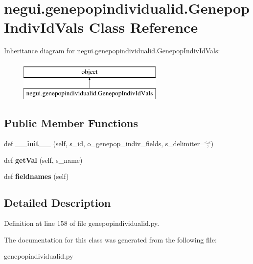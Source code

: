 \hypertarget{classnegui_1_1genepopindividualid_1_1GenepopIndivIdVals}{}\section{negui.\+genepopindividualid.\+Genepop\+Indiv\+Id\+Vals Class Reference}
\label{classnegui_1_1genepopindividualid_1_1GenepopIndivIdVals}
Inheritance diagram for negui.\+genepopindividualid.\+Genepop\+Indiv\+Id\+Vals\+:\begin{figure}[H]
\begin{center}
\leavevmode
\includegraphics[height=2.000000cm]{classnegui_1_1genepopindividualid_1_1GenepopIndivIdVals}
\end{center}
\end{figure}
\subsection*{Public Member Functions}
\begin{DoxyCompactItemize}
\item 
def {\bfseries \+\_\+\+\_\+init\+\_\+\+\_\+} (self, s\+\_\+id, o\+\_\+genepop\+\_\+indiv\+\_\+fields, s\+\_\+delimiter=\char`\"{};\char`\"{})\hypertarget{classnegui_1_1genepopindividualid_1_1GenepopIndivIdVals_a72145be2e4d8a444567c89818f3c0814}{}\label{classnegui_1_1genepopindividualid_1_1GenepopIndivIdVals_a72145be2e4d8a444567c89818f3c0814}

\item 
def {\bfseries get\+Val} (self, s\+\_\+name)\hypertarget{classnegui_1_1genepopindividualid_1_1GenepopIndivIdVals_a603565db54797a7551e4632b9d3442b3}{}\label{classnegui_1_1genepopindividualid_1_1GenepopIndivIdVals_a603565db54797a7551e4632b9d3442b3}

\item 
def {\bfseries fieldnames} (self)\hypertarget{classnegui_1_1genepopindividualid_1_1GenepopIndivIdVals_af40421346609ca97846993710f086802}{}\label{classnegui_1_1genepopindividualid_1_1GenepopIndivIdVals_af40421346609ca97846993710f086802}

\end{DoxyCompactItemize}


\subsection{Detailed Description}


Definition at line 158 of file genepopindividualid.\+py.



The documentation for this class was generated from the following file\+:\begin{DoxyCompactItemize}
\item 
genepopindividualid.\+py\end{DoxyCompactItemize}

